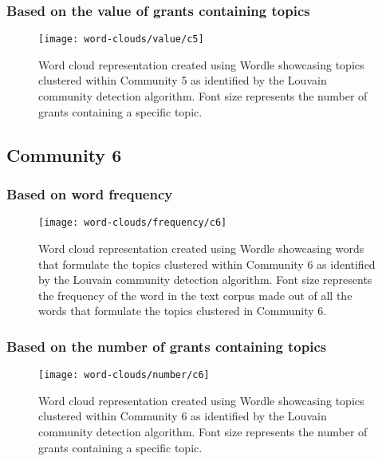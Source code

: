 \subsubsection{Based on the value of grants containing topics}

\begin{figure}[htbp]
    \centering
    \texttt{[image: word-clouds/value/c5]}
    \caption[Word cloud representation based on the value of grants containing topics clustered within Community 5]{Word cloud representation created using Wordle showcasing topics clustered within Community 5 as identified by the Louvain community detection algorithm. Font size represents the number of grants containing a specific topic.}
    \label{fig:topic_grant_value_c5}
\end{figure}

\clearpage

\subsection{Community 6}

\subsubsection{Based on word frequency}

\begin{figure}[htbp]
    \centering
    \texttt{[image: word-clouds/frequency/c6]}
    \caption[Word cloud representation based on word frequency showcasing words that formulate the topics clustered within Community 6]{Word cloud representation created using Wordle showcasing words that formulate the topics clustered within Community 6 as identified by the Louvain community detection algorithm. Font size represents the frequency of the word in the text corpus made out of all the words that formulate the topics clustered in Community 6.}
    \label{fig:topic_grant_freq_c6}
\end{figure}

\subsubsection{Based on the number of grants containing topics}

\begin{figure}[htbp]
    \centering
    \texttt{[image: word-clouds/number/c6]}
    \caption[Word cloud representation based on the number of grants containing topics clustered within Community 6]{Word cloud representation created using Wordle showcasing topics clustered within Community 6 as identified by the Louvain community detection algorithm. Font size represents the number of grants containing a specific topic.}
    \label{fig:topic_grant_number_c6}
\end{figure}

